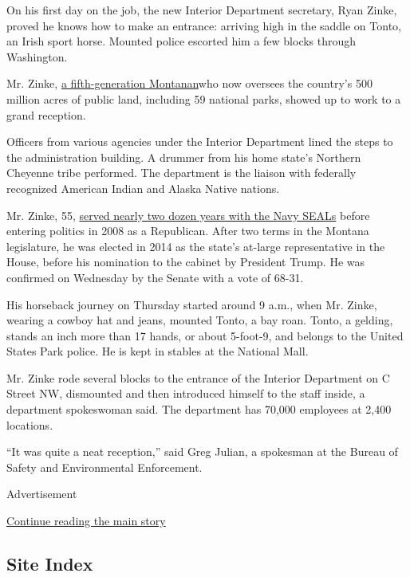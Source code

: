 On his first day on the job, the new Interior Department secretary, Ryan
Zinke, proved he knows how to make an entrance: arriving high in the
saddle on Tonto, an Irish sport horse. Mounted police escorted him a few
blocks through Washington.

Mr. Zinke,
\href{https://www.nytimes.com/2017/01/16/us/politics/ryan-zinke-navy-seal.html}{a
fifth-generation Montanan}who now oversees the country's 500 million
acres of public land, including 59 national parks, showed up to work to
a grand reception.

Officers from various agencies under the Interior Department lined the
steps to the administration building. A drummer from his home state's
Northern Cheyenne tribe performed. The department is the liaison with
federally recognized American Indian and Alaska Native nations.

Mr. Zinke, 55,
\href{https://www.nytimes.com/interactive/2017/01/16/us/politics/document-Ryan-Zinke-Navy-SEAL-Records.html}{served
nearly two dozen years with the Navy SEALs} before entering politics in
2008 as a Republican. After two terms in the Montana legislature, he was
elected in 2014 as the state's at-large representative in the House,
before his nomination to the cabinet by President Trump. He was
confirmed on Wednesday by the Senate with a vote of 68-31.

His horseback journey on Thursday started around 9 a.m., when Mr. Zinke,
wearing a cowboy hat and jeans, mounted Tonto, a bay roan. Tonto, a
gelding, stands an inch more than 17 hands, or about 5-foot-9, and
belongs to the United States Park police. He is kept in stables at the
National Mall.

Mr. Zinke rode several blocks to the entrance of the Interior Department
on C Street NW, dismounted and then introduced himself to the staff
inside, a department spokeswoman said. The department has 70,000
employees at 2,400 locations.

``It was quite a neat reception,'' said Greg Julian, a spokesman at the
Bureau of Safety and Environmental Enforcement.

Advertisement

\protect\hyperlink{after-bottom}{Continue reading the main story}

\hypertarget{site-index}{%
\subsection{Site Index}\label{site-index}}

